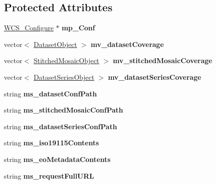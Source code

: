 \subsection*{Protected Attributes}
\begin{DoxyCompactItemize}
\item 
\hypertarget{classWCS__T_a25a1dddf92f30d4ce4a0e7c3055c3efd}{
\hyperlink{classWCS__Configure}{WCS\_\-Configure} $\ast$ {\bfseries mp\_\-Conf}}
\label{classWCS__T_a25a1dddf92f30d4ce4a0e7c3055c3efd}

\item 
\hypertarget{classWCS__T_a83b82947270b9e75fa776ebff06cb5fd}{
vector$<$ \hyperlink{classDatasetObject}{DatasetObject} $>$ {\bfseries mv\_\-datasetCoverage}}
\label{classWCS__T_a83b82947270b9e75fa776ebff06cb5fd}

\item 
\hypertarget{classWCS__T_a268f2bb09efa55ab7cd328f8f79dd414}{
vector$<$ \hyperlink{classStitchedMosaicObject}{StitchedMosaicObject} $>$ {\bfseries mv\_\-stitchedMosaicCoverage}}
\label{classWCS__T_a268f2bb09efa55ab7cd328f8f79dd414}

\item 
\hypertarget{classWCS__T_a288a4d72e91b32e125e47407153ead98}{
vector$<$ \hyperlink{classDatasetSeriesObject}{DatasetSeriesObject} $>$ {\bfseries mv\_\-datasetSeriesCoverage}}
\label{classWCS__T_a288a4d72e91b32e125e47407153ead98}

\item 
\hypertarget{classWCS__T_abe41bcce822e58cd39bcbbeaebc865cf}{
string {\bfseries ms\_\-datasetConfPath}}
\label{classWCS__T_abe41bcce822e58cd39bcbbeaebc865cf}

\item 
\hypertarget{classWCS__T_a8f0b657e019f3ab00e7abb614b410bb8}{
string {\bfseries ms\_\-stitchedMosaicConfPath}}
\label{classWCS__T_a8f0b657e019f3ab00e7abb614b410bb8}

\item 
\hypertarget{classWCS__T_a7213d7699e60f0d54835c8a21bd80dc7}{
string {\bfseries ms\_\-datasetSeriesConfPath}}
\label{classWCS__T_a7213d7699e60f0d54835c8a21bd80dc7}

\item 
\hypertarget{classWCS__T_abcf3dec906024653cae1b00a2e2545a6}{
string {\bfseries ms\_\-iso19115Contents}}
\label{classWCS__T_abcf3dec906024653cae1b00a2e2545a6}

\item 
\hypertarget{classWCS__T_af971eb396be85676d54b62df318ad9a8}{
string {\bfseries ms\_\-eoMetadataContents}}
\label{classWCS__T_af971eb396be85676d54b62df318ad9a8}

\item 
\hypertarget{classWCS__T_a11312460f10652b429b21a1bb58fe442}{
string {\bfseries ms\_\-requestFullURL}}
\label{classWCS__T_a11312460f10652b429b21a1bb58fe442}

\end{DoxyCompactItemize}


